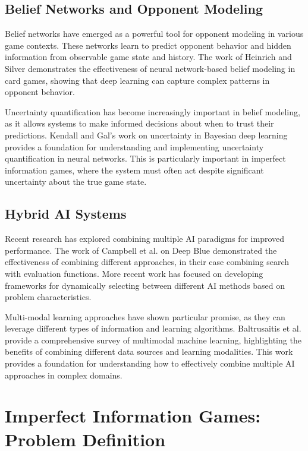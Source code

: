 \documentclass[conference]{IEEEtran}
\begin{document}
\subsection{Belief Networks and Opponent Modeling}

Belief networks have emerged as a powerful tool for opponent modeling in various game contexts. These networks learn to predict opponent behavior and hidden information from observable game state and history. The work of Heinrich and Silver demonstrates the effectiveness of neural network-based belief modeling in card games, showing that deep learning can capture complex patterns in opponent behavior.

Uncertainty quantification has become increasingly important in belief modeling, as it allows systems to make informed decisions about when to trust their predictions. Kendall and Gal's work on uncertainty in Bayesian deep learning provides a foundation for understanding and implementing uncertainty quantification in neural networks. This is particularly important in imperfect information games, where the system must often act despite significant uncertainty about the true game state.

\subsection{Hybrid AI Systems}

Recent research has explored combining multiple AI paradigms for improved performance. The work of Campbell et al. on Deep Blue demonstrated the effectiveness of combining different approaches, in their case combining search with evaluation functions. More recent work has focused on developing frameworks for dynamically selecting between different AI methods based on problem characteristics.

Multi-modal learning approaches have shown particular promise, as they can leverage different types of information and learning algorithms. Baltrusaitis et al. provide a comprehensive survey of multimodal machine learning, highlighting the benefits of combining different data sources and learning modalities. This work provides a foundation for understanding how to effectively combine multiple AI approaches in complex domains.

\section{Imperfect Information Games: Problem Definition}
\end{document}
